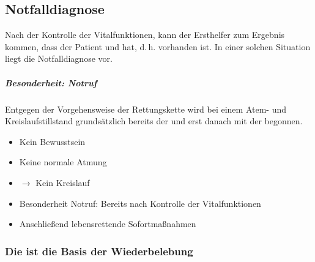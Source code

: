 \subsection{Notfalldiagnose }
\label{topic:reanimation-eh}
\label{topic:notfalldiagnose-atem-kreislaufstillstand}

\TextSlide{\TxBeschreibung}
{Nach der Kontrolle der Vitalfunktionen, kann der
Ersthelfer zum Ergebnis kommen, dass der Patient  und 
 hat, d.\,h.  vorhanden ist.
In einer solchen Situation liegt die Notfalldiagnose
 vor.

\subparagraph{Besonderheit: Notruf}
%
Entgegen der Vorgehensweise der Rettungskette wird bei
einem Atem- und Kreislaufstillstand grundsätzlich bereits
 der  und erst danach mit der  begonnen. 
}{
\begin{itemize}
  \item Kein Bewusstsein
  \item Keine normale Atmung
  \item $\rightarrow$ Kein Kreislauf
  \item Besonderheit Notruf: Bereits nach Kontrolle der Vitalfunktionen
  \item Anschließend lebensrettende Sofortmaßnahmen
\end{itemize}
}{}{}{}






\subsubsection{Die  ist die Basis der Wiederbelebung}



